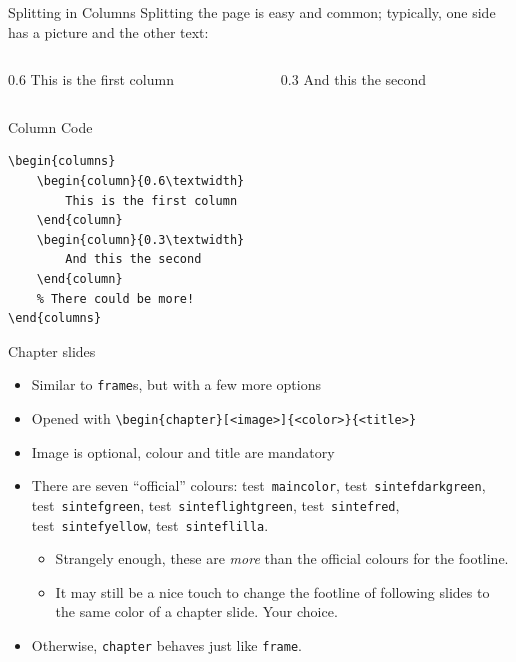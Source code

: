 \documentclass{beamer}
\newcommand{\testcolor}[1]{\colorbox{#1}{\textcolor{#1}{test}}~\texttt{#1}}
\begin{document}
\begin{frame}[fragile]{Splitting in Columns}
Splitting the page is easy and common;
typically, one side has a picture and the other text:
\begin{columns}
\begin{column}{0.6\textwidth}
This is the first column
\end{column}
\begin{column}{0.3\textwidth}
And this the second
\end{column}
\end{columns}
\begin{block}{Column Code}
\begin{verbatim}
\begin{columns}
    \begin{column}{0.6\textwidth}
        This is the first column
    \end{column}
    \begin{column}{0.3\textwidth}
        And this the second
    \end{column}
    % There could be more!
\end{columns}
\end{verbatim}
\end{block}
\end{frame}


\begin{frame}[fragile]{Chapter slides}
\begin{itemize}
\item Similar to \verb|frame|s, but with a few more options
\item Opened with \verb|\begin{chapter}[<image>]{<color>}{<title>}|
\item Image is optional, colour and title are mandatory
\item There are seven ``official'' colours: \testcolor{maincolor}, 
\testcolor{sintefdarkgreen}, \testcolor{sintefgreen}, 
\testcolor{sinteflightgreen}, \testcolor{sintefred}, \testcolor{sintefyellow}, 
\testcolor{sinteflilla}.
      \begin{itemize}
      \item Strangely enough, these are \emph{more} than the official colours 
      for the footline.
      \item It may still be a nice touch to change the footline of following 
      slides to the same color of a chapter slide. Your choice.
      \end{itemize}
\item Otherwise, \verb|chapter| behaves just like \verb|frame|.
\end{itemize}
\end{frame}
\end{document}
